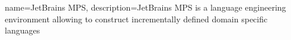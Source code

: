 {
  name=JetBrains MPS,
  description={JetBrains MPS is a language engineering environment 
  allowing to construct incrementally defined domain specific languages}
}